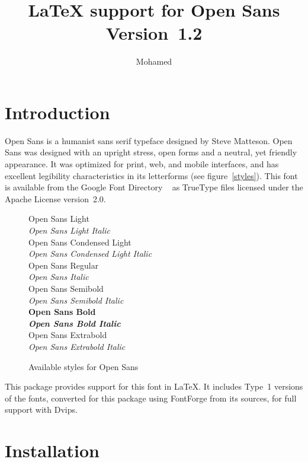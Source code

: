 \documentclass{article}
\title{\LaTeX{} support for Open Sans\\Version~1.2}
\author{Mohamed \name{El~Morabity}\\\email{melmorabity@fedoraproject.org}}
\newcommand{\name}{}
\newcommand{\program}{}
\begin{document}
\maketitle

\tableofcontents

\section{Introduction}

Open Sans is a humanist sans serif typeface designed by Steve
\name{Matteson}. Open Sans was designed with an upright stress, open forms and a
neutral, yet friendly appearance. It was optimized for print, web, and mobile
interfaces, and has excellent legibility characteristics in its letterforms (see
figure~\vref{styles}). This font is available from the Google Font Directory
~\cite{opensans} as TrueType files licensed under the Apache License
version~2.0.

\begin{figure}
  \centering
  \fosfamily%
  {%
    {\selectfont Open Sans Light}\\
    {\selectfont\itshape Open Sans Light Italic}\\
    {\selectfont Open Sans Condensed Light}\\
    {\selectfont\itshape Open Sans Condensed Light Italic}\\
    Open Sans Regular\\
    {\itshape Open Sans Italic}\\
    {\selectfont Open Sans Semibold}\\
    {\selectfont\itshape Open Sans Semibold Italic}\\
    {\bfseries Open Sans Bold}\\
    {\bfseries\itshape Open Sans Bold Italic}\\
    {\selectfont Open Sans Extrabold}\\
    {\selectfont\itshape Open Sans Extrabold Italic}%
  }
  \caption{Available styles for Open Sans}
  \label{styles}
\end{figure}

This package provides support for this font in \LaTeX. It includes Type~1
versions of the fonts, converted for this package using \program{FontForge} from
its sources, for full support with \program{Dvips}.

\section{Installation}
\end{document}
